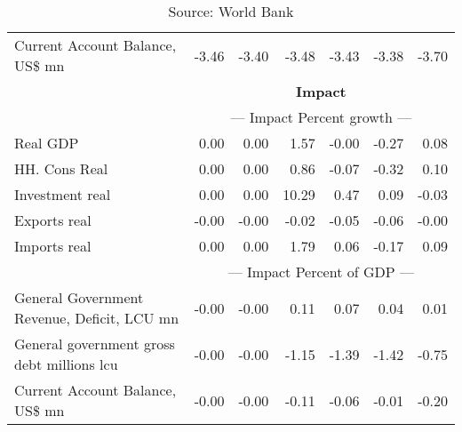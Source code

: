 \documentclass{article}
\begin{document}
\begin{table}[ht]
\begin{tabular}{lrrrrr|r}
Current Account Balance, US\$ mn & -3.46 & -3.40 & -3.48 & -3.43 & -3.38 & -3.70 \\
&\multicolumn{6}{c}{{\large \textbf{Impact}}}                               \\
&\multicolumn{6}{c}{{--- Impact Percent growth ---}}                               \\
Real GDP & 0.00 & 0.00 & 1.57 & -0.00 & -0.27 & 0.08 \\
HH. Cons Real & 0.00 & 0.00 & 0.86 & -0.07 & -0.32 & 0.10 \\
Investment real & 0.00 & 0.00 & 10.29 & 0.47 & 0.09 & -0.03 \\
Exports real & -0.00 & -0.00 & -0.02 & -0.05 & -0.06 & -0.00 \\
Imports real & 0.00 & 0.00 & 1.79 & 0.06 & -0.17 & 0.09 \\
&\multicolumn{6}{c}{{--- Impact Percent of GDP ---}}                               \\
General Government Revenue, Deficit, LCU mn & -0.00 & -0.00 & 0.11 & 0.07 & 0.04 & 0.01 \\
General government gross debt millions lcu & -0.00 & -0.00 & -1.15 & -1.39 & -1.42 & -0.75 \\
Current Account Balance, US\$ mn & -0.00 & -0.00 & -0.11 & -0.06 & -0.01 & -0.20 \\
\bottomrule
\end{tabular}
\caption*{Source: World Bank}
\end{table}
\end{document}
